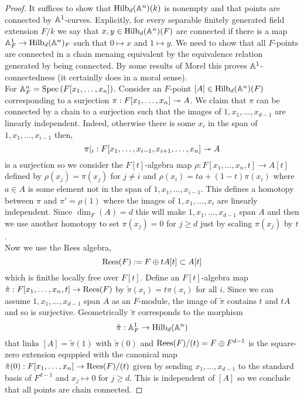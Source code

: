 \documentclass[12pt]{article}
\begin{document}
\begin{proof}
It suffices to show that $\mathrm{Hilb}_d(\mathbb{A}^n)(k)$ is nonempty and that points are connected by $\mathbb{A}^1$-curves. Explicitly, for every separable finitely generated field extension $F / k$ we say that $x, y \in \mathrm{Hilb}_d(\mathbb{A}^n)(F)$ are connected if there is a map $\mathbb{A}^1_F \to \mathrm{Hilb}_d(\mathbb{A}^n)_F$ such that $0 \mapsto x$ and $1 \mapsto y$. We need to show that all $F$-points are connected in a chain menaing equivalent by the equivalence relation generated by being connected. By some results of Morel this proves $\mathbb{A}^1$-connectedness (it certainlly does in a moral sense). 
\bigskip\\
For $\mathbb{A}^n_F = \mathrm{Spec}\left( F[x_1, \dots, x_n] \right)$. Consider an $F$-point $[A] \in \mathrm{Hilb}_d(\mathbb{A}^n)(F)$ corresponding to a surjection $\pi : F[x_1, \dots, x_n] \twoheadrightarrow A$. We claim that $\pi$ can be connected by a chain to a surjection such that the images of $1, x_1, \dots, x_{d-1}$ are linearly independent. Indeed, otherwise there is some $x_i$ in the span of $1, x_1, \dots, x_{i-1}$ then,
\[ \pi|_i : F[x_1, \dots, x_{i-1}, x_{i+1}, \dots, x_n] \twoheadrightarrow A \]
is a surjection so we consider the $F[t]$-algebra map $\rho : F[x_1, \dots, x_n, t] \to A[t]$ defined by $\rho(x_j) = \pi(x_j)$ for $j \neq i$ and $\rho(x_i) = t a + (1 - t) \pi(x_i)$ where $a \in A$ is some element not in the span of $1, x_1, \dots, x_{i-1}$. This defines a homotopy between $\pi$ and $\pi' = \rho(1)$ where the images of $1, x_1, \dots, x_{i}$ are linearly independent. Since $\dim_F(A) = d$ this will make $1, x_1, \dots, x_{d-1}$ span $A$ and then we use another homotopy to set $\pi(x_{j}) = 0$ for $j \ge d$ just by scaling $\pi(x_j)$ by $t$.
\bigskip\\
Now we use the Rees algebra,
\[ \mathrm{Rees}(F) := F \oplus t A[t] \subset A[t] \]
which is finithe locally free over $F[t]$. Define an $F[t]$-algebra map $\tilde{\pi} : F[x_1, \dots, x_n, t] \to \mathrm{Rees}(F)$ by $\tilde{\pi}(x_i) = t \pi(x_i)$ for all $i$. Since we can assume $1, x_1, \dots, x_{d-1}$ span $A$ as an $F$-module, the image of $\tilde{\pi}$ contains $t$ and $t A$ and so is surjective. Geometrically $\tilde{\pi}$ corresponds to the morphism 
\[ \tilde{\pi} : \mathbb{A}^1_F \to \mathrm{Hilb}_d(\mathbb{A}^n) \]
that links $[A] = \tilde{\pi}(1)$ with $\tilde{\pi}(0)$ and $\mathrm{Rees}(F)/(t) = F \oplus F^{d-1}$ is the square-zero extension equppied with the canonical map $\tilde{\pi}(0) : F[x_1, \dots, x_n] \to \mathrm{Rees}(F)/(t)$ given by sending $x_1, \dots, x_{d-1}$ to the standard basis of $F^{d-1}$ and $x_j \mapsto 0$ for $j \ge d$. This is independent of $[A]$ so we conclude that all points are chain connected.
\end{proof}
\end{document}
